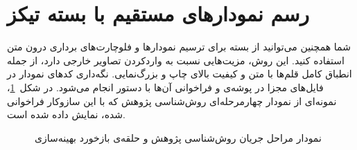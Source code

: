 \section{رسم نمودارهای مستقیم با بسته تیکز}\label{sec:2-4}

شما همچنین می‌توانید از بسته  برای ترسیم نمودارها و فلوچارت‌های برداری درون متن استفاده کنید. این روش، مزیت‌هایی نسبت به واردکردن تصاویر خارجی دارد، از جمله انطباق کامل قلم‌ها با متن و کیفیت بالای چاپ و بزرگ‌نمایی. نگه‌داری کدهای نمودار در فایل‌های مجزا در پوشه‌ی  و فراخوانی آن‌ها با دستور  انجام می‌شود. در شکل~\ref{fig:chap2_pipeline}، نمونه‌ای از نمودار چهارمرحله‌ای روش‌شناسی پژوهش که با این سازوکار فراخوانی شده، نمایش داده شده است.

\vspace{0.25cm}
\begin{figure}[!ht]
    \centering
    
    \caption{نمودار مراحل جریان روش‌شناسی پژوهش و حلقه‌ی بازخورد بهینه‌سازی}\label{fig:chap2_pipeline}
\end{figure}
